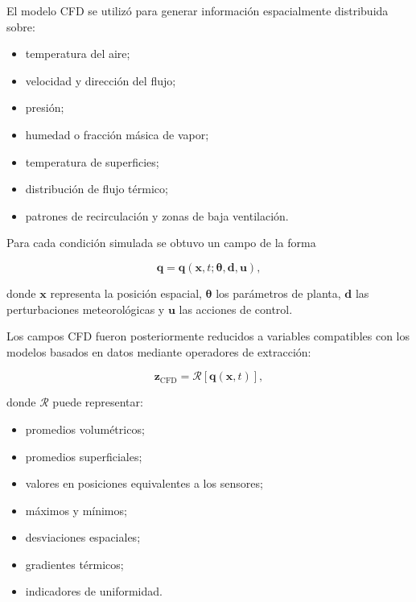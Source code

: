 El modelo CFD se utilizó para generar información espacialmente distribuida sobre:

\begin{itemize}
    \item temperatura del aire;
    \item velocidad y dirección del flujo;
    \item presión;
    \item humedad o fracción másica de vapor;
    \item temperatura de superficies;
    \item distribución de flujo térmico;
    \item patrones de recirculación y zonas de baja ventilación.
\end{itemize}

Para cada condición simulada se obtuvo un campo de la forma

\begin{equation}
\mathbf{q}
=
\mathbf{q}
\left(
\mathbf{x},
t;
\boldsymbol{\theta},
\mathbf{d},
\mathbf{u}
\right),
\label{eq:campo_cfd_simulado}
\end{equation}

donde $\mathbf{x}$ representa la posición espacial, $\boldsymbol{\theta}$ los parámetros de planta, $\mathbf{d}$ las perturbaciones meteorológicas y $\mathbf{u}$ las acciones de control.

Los campos CFD fueron posteriormente reducidos a variables compatibles con los modelos basados en datos mediante operadores de extracción:

\begin{equation}
\mathbf{z}_{\mathrm{CFD}}
=
\mathcal{R}
\left[
\mathbf{q}
\left(
\mathbf{x},t
\right)
\right],
\label{eq:operador_reduccion_cfd}
\end{equation}

donde $\mathcal{R}$ puede representar:

\begin{itemize}
    \item promedios volumétricos;
    \item promedios superficiales;
    \item valores en posiciones equivalentes a los sensores;
    \item máximos y mínimos;
    \item desviaciones espaciales;
    \item gradientes térmicos;
    \item indicadores de uniformidad.
\end{itemize}

